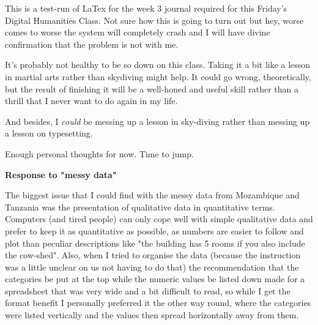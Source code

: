 \documentclass{article}
\begin{document}
This is a test-run of LaTex for the week 3 journal required for this Friday's Digital Humanities Class. Not sure how this is going to turn out but hey, worse comes to worse the system will completely crash and I will have divine confirmation that the problem is not with me.

It's probably not healthy to be so down on this class. Taking it a bit like a lesson in martial arts rather than skydiving might help. It could go wrong, theoretically, but the result of finishing it will be a well-honed and useful skill rather than a thrill that I never want to do again in my life.

And besides, I \textit{could} be messing up a lesson in sky-diving rather than messing up a lesson on typesetting.

Enough personal thoughts for now. Time to jump.

\textbf{Response to "messy data"}

The biggest issue that I could find with the messy data from Mozambique and Tanzania was the presentation of qualitative data in quantitative terms. Computers (and tired people) can only cope well with simple qualitative data and prefer to keep it as quantitative as possible, as numbers are easier to follow and plot than peculiar descriptions like "the building has 5 rooms if you also include the cow-shed". Also, when I tried to organise the data (because the instruction was a little unclear on us not having to do that) the recommendation that the categories be put at the top while the numeric values be listed down made for a spreadsheet that was very wide and a bit difficult to read, so while I get the format benefit I personally preferred it the other way round, where the categories were listed vertically and the values then spread horizontally away from them.
\end{document}
